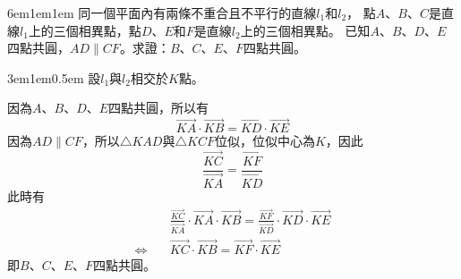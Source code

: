 \documentclass[12pt]{article}
\begin{document}
\begin{mybox}[例題\thesubsection-2]{6em}{1em}{1em}
    同一個平面內有兩條不重合且不平行的直線$l_1$和$l_2$，
    點$A$、$B$、$C$是直線$l_1$上的三個相異點，點$D$、$E$和$F$是直線$l_2$上的三個相異點。
    已知$A$、$B$、$D$、$E$四點共圓，$AD\parallel CF$。求證：$B$、$C$、$E$、$F$四點共圓。
\end{mybox}
\begin{mybox}[解]{3em}{1em}{0.5em}
    設$l_1$與$l_2$相交於$K$點。

    因為$A$、$B$、$D$、$E$四點共圓，所以有
    $$
        \overrightarrow{KA}\cdot\overrightarrow{KB}=\overrightarrow{KD}\cdot\overrightarrow{KE}
    $$
    因為$AD\parallel CF$，所以$\triangle{KAD}$與$\triangle{KCF}$位似，位似中心為$K$，因此
    $$
        \frac{\overrightarrow{KC}}{\overrightarrow{KA}}=\frac{\overrightarrow{KF}}{\overrightarrow{KD}}
    $$
    此時有
    \begin{align*}
        &\frac{\overrightarrow{KC}}{\overrightarrow{KA}}\cdot\overrightarrow{KA}\cdot\overrightarrow{KB}
        =\frac{\overrightarrow{KF}}{\overrightarrow{KD}}\cdot\overrightarrow{KD}\cdot\overrightarrow{KE}\\
        \Leftrightarrow\quad&\overrightarrow{KC}\cdot\overrightarrow{KB}=\overrightarrow{KF}\cdot\overrightarrow{KE}
    \end{align*}
    即$B$、$C$、$E$、$F$四點共圓。
\end{mybox}
\newpage
\end{document}
